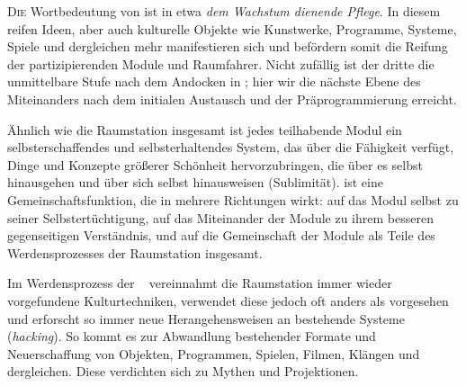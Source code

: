     
\begin{newstuff}
    \lettrine{D}{ie} Wortbedeutung von  ist in etwa \emph{dem Wachstum dienende Pflege}. In diesem  reifen Ideen, aber auch kulturelle Objekte wie Kunstwerke, Programme, Systeme, Spiele und dergleichen mehr manifestieren sich und befördern somit die Reifung der partizipierenden Module und Raumfahrer. Nicht zufällig ist der dritte  die unmittelbare Stufe nach dem Andocken in ; hier wir die nächste Ebene des Miteinanders nach dem initialen Austausch und der Präprogrammierung erreicht. 


    Ähnlich wie die Raumstation insgesamt ist jedes teilhabende Modul ein selbst\-er\-schaf\-fendes und selbsterhaltendes System, das über die Fähigkeit verfügt, Dinge und Konzepte größerer Schönheit hervorzubringen, die über es selbst hinausgehen und über sich selbst hinausweisen (Sublimität).  ist eine Gemeinschaftsfunktion, die in mehrere Richtungen wirkt: auf das Modul selbst zu seiner Selbstertüchtigung, auf das Miteinander der Module zu ihrem besseren gegenseitigen Verständnis, und auf die Gemeinschaft der Module als Teile des Werdensprozesses der Raumstation insgesamt.

    Im Werdensprozess der \  vereinnahmt die Raumstation immer wieder vorgefundene Kulturtechniken, verwendet diese jedoch oft anders als vorgesehen und erforscht so immer neue Herangehensweisen an bestehende Systeme (\emph{hacking}). So kommt es zur Abwandlung bestehender Formate und Neuerschaffung von Objekten, Programmen, Spielen, Filmen,  Klängen und dergleichen. Diese verdichten sich zu Mythen und Projektionen.


        

\end{newstuff}
